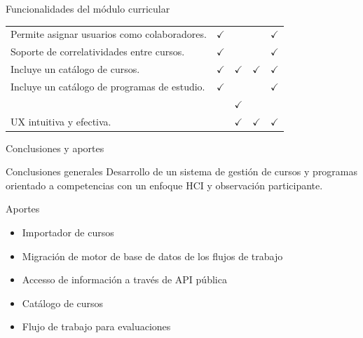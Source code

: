 \documentclass[10pt,xcolor=table ]{beamer}
\begin{document}
\begin{frame}{Funcionalidades del módulo curricular}
\begin{table}[]
{\begin{tabular}{@{}lllccll@{}}
	\multicolumn{3}{l}{Permite asignar usuarios como colaboradores.}        & $\checkmark$ &              &              & $\checkmark$ \\
	\multicolumn{3}{l}{Soporte de correlatividades entre cursos.}           & $\checkmark$ &              &              & $\checkmark$ \\
	\multicolumn{3}{l}{Incluye un catálogo de cursos.}                      & $\checkmark$ & $\checkmark$ & $\checkmark$ & $\checkmark$ \\
	\multicolumn{3}{l}{Incluye un catálogo de programas de estudio.}        & $\checkmark$ &              &              & $\checkmark$ \\
	\rowcolor[HTML]{ECF4FF}
	\multicolumn{3}{l}{Incluye un catálogo de competencias.}                &              &              &              & $\checkmark$ \\
	\multicolumn{3}{l}{UX intuitiva y efectiva.}                            &              & $\checkmark$ & $\checkmark$ & $\checkmark$ \\ \midrule
	\end{tabular}
	}
\end{table}
\end{frame}

\begin{frame}{Conclusiones y aportes}
	\begin{alertblock}{Conclusiones generales}
		Desarrollo de un sistema de gestión de cursos y programas orientado a competencias con un enfoque HCI y observación participante.
	\end{alertblock}

	\begin{block}{Aportes}
		\begin{itemize}
			\item Importador de cursos
		    \item Migración de motor de base de datos de los flujos de trabajo
		    \item Accesso de información a través de API pública
		    \item Catálogo de cursos
		    \item Flujo de trabajo para evaluaciones
    	\end{itemize}
	\end{block}
\end{frame}
\end{document}
